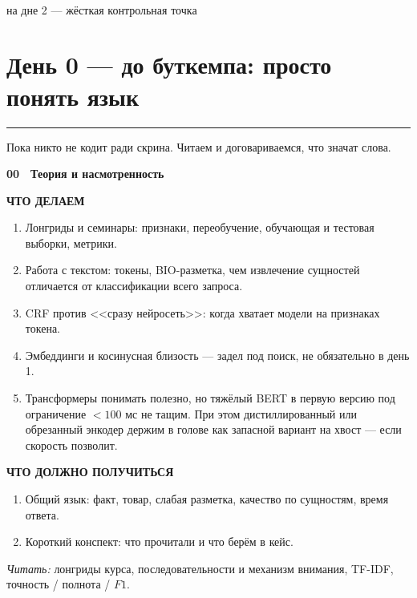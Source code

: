 \documentclass[11pt,a4paper]{article}
\newcommand{\secrule}{%
  \par\vspace{4pt}%
  {\color{mvred}\noindent\rule{\linewidth}{0.9pt}\par}%
  \vspace{8pt}%
}
\newcommand{\daysection}[1]{%
  \Needspace{22\baselineskip}%
  \section{#1}\secrule
}
\newcommand{\dayblock}[4]{%
  \begin{tcolorbox}[
    enhanced,
    colback=white,
    colframe=rulec,
    boxrule=0.65pt,
    arc=2pt,
    left=8pt,
    right=8pt,
    top=8pt,
    bottom=8pt,
    before skip=3pt,
    after skip=11pt,
  ]
  {\color{mvred}\bfseries #1}~~{\bfseries #2}\par\vspace{4pt}%
  {\scriptsize\bfseries\color{inksoft}ЧТО ДЕЛАЕМ}\par\vspace{1pt}%
  #3\par\vspace{5pt}%
  {\scriptsize\bfseries\color{mint}ЧТО ДОЛЖНО ПОЛУЧИТЬСЯ}\par\vspace{1pt}%
  #4%
  \end{tcolorbox}%
}
\begin{document}
\vspace{0.2cm}
\begin{center}
\\[3pt]
{\tiny\color{mvred}на дне 2 --- жёсткая контрольная точка}
\end{center}

\daysection{День 0 --- до буткемпа: просто понять язык}
Пока никто не кодит ради скрина. Читаем и договариваемся, что значат слова.

\dayblock{00}{Теория и насмотренность}{%
\begin{enumerate}
  \item Лонгриды и семинары: признаки, переобучение, обучающая и тестовая выборки, метрики.
  \item Работа с текстом: токены, BIO-разметка, чем извлечение сущностей отличается от классификации всего запроса.
  \item CRF против <<сразу нейросеть>>: когда хватает модели на признаках токена.
  \item Эмбеддинги и косинусная близость --- задел под поиск, не обязательно в день 1.
  \item Трансформеры понимать полезно, но тяжёлый BERT в первую версию под ограничение $<100$ мс не тащим. При этом дистиллированный или обрезанный энкодер держим в голове как запасной вариант на хвост --- если скорость позволит.
\end{enumerate}
}{%
\begin{enumerate}
  \item Общий язык: факт, товар, слабая разметка, качество по сущностям, время ответа.
  \item Короткий конспект: что прочитали и что берём в кейс.
\end{enumerate}
}
\noindent\textit{Читать:} лонгриды курса, последовательности и механизм внимания, TF-IDF, точность / полнота / $F1$.
\end{document}
